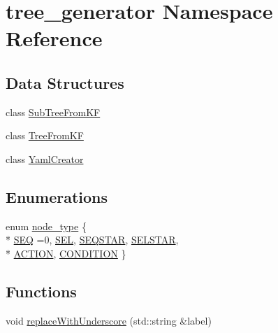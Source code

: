 \hypertarget{namespacetree__generator}{\section{tree\-\_\-generator Namespace Reference}
\label{namespacetree__generator}
}
\subsection*{Data Structures}
\begin{DoxyCompactItemize}
\item 
class \hyperlink{classtree__generator_1_1SubTreeFromKF}{Sub\-Tree\-From\-K\-F}
\item 
class \hyperlink{classtree__generator_1_1TreeFromKF}{Tree\-From\-K\-F}
\item 
class \hyperlink{classtree__generator_1_1YamlCreator}{Yaml\-Creator}
\end{DoxyCompactItemize}
\subsection*{Enumerations}
\begin{DoxyCompactItemize}
\item 
enum \hyperlink{namespacetree__generator_a9bc65da10ffa6c37e8717801e2f3a36c_a9bc65da10ffa6c37e8717801e2f3a36c}{node\-\_\-type} \{ \\*
\hyperlink{namespacetree__generator_a9bc65da10ffa6c37e8717801e2f3a36c_a9bc65da10ffa6c37e8717801e2f3a36ca25b1e67936c5b5bb0f08476055226b5c}{S\-E\-Q} =0, 
\hyperlink{namespacetree__generator_a9bc65da10ffa6c37e8717801e2f3a36c_a9bc65da10ffa6c37e8717801e2f3a36ca7b0d4c3b3e5dbafc790ac4ffc9a65d0d}{S\-E\-L}, 
\hyperlink{namespacetree__generator_a9bc65da10ffa6c37e8717801e2f3a36c_a9bc65da10ffa6c37e8717801e2f3a36caa98b1df5905b1a47dc633a439b14501a}{S\-E\-Q\-S\-T\-A\-R}, 
\hyperlink{namespacetree__generator_a9bc65da10ffa6c37e8717801e2f3a36c_a9bc65da10ffa6c37e8717801e2f3a36ca129219a93b4c472d7d41bb8828979bad}{S\-E\-L\-S\-T\-A\-R}, 
\\*
\hyperlink{namespacetree__generator_a9bc65da10ffa6c37e8717801e2f3a36c_a9bc65da10ffa6c37e8717801e2f3a36cadf0fa1a113e6aa7fb488db50d840dd92}{A\-C\-T\-I\-O\-N}, 
\hyperlink{namespacetree__generator_a9bc65da10ffa6c37e8717801e2f3a36c_a9bc65da10ffa6c37e8717801e2f3a36cad521aa9a6db33d4aa5e23c6cd5efc51c}{C\-O\-N\-D\-I\-T\-I\-O\-N}
 \}
\end{DoxyCompactItemize}
\subsection*{Functions}
\begin{DoxyCompactItemize}
\item 
void \hyperlink{namespacetree__generator_afaba6c339abcc27aafb585044b662d2e_afaba6c339abcc27aafb585044b662d2e}{replace\-With\-Underscore} (std\-::string \&label)
\end{DoxyCompactItemize}


